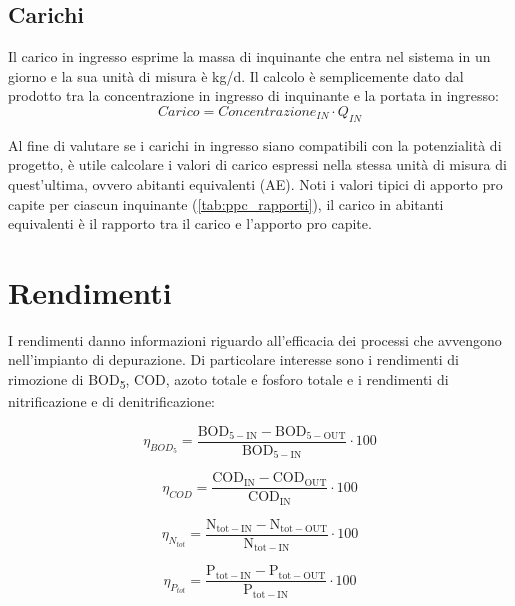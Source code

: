 \subsection{Carichi}
\label{subsec:carichi}
Il carico in ingresso esprime la massa di inquinante che entra nel sistema in un giorno e la sua unità di misura è kg/d. Il calcolo è semplicemente dato dal prodotto tra la concentrazione in ingresso di inquinante e la portata in ingresso:
\begin{equation}
Carico=Concentrazione_{IN}\cdot Q_{IN}
\end{equation}

Al fine di valutare se i carichi in ingresso siano compatibili con la potenzialità di progetto, è utile calcolare i valori di carico espressi nella stessa unità di misura di quest'ultima, ovvero abitanti equivalenti (AE). Noti i valori tipici di apporto pro capite per ciascun inquinante (\autoref{tab:ppc_rapporti}), il carico in abitanti equivalenti è il rapporto tra il carico e l'apporto pro capite.

\section{Rendimenti}
\label{sec:rend}
I rendimenti danno informazioni riguardo all'efficacia dei processi che avvengono nell'impianto di depurazione. Di particolare interesse sono i rendimenti di rimozione di BOD\textsubscript{5}, COD, azoto totale e fosforo totale e i rendimenti di nitrificazione e di denitrificazione:

\begin{equation}
\eta_{BOD_{5}}=\frac{\operatorname{BOD_{5-IN}}-\operatorname{BOD_{5-OUT}}}{\operatorname{BOD_{5-IN}}}\cdot 100
\end{equation}

\begin{equation}
\eta_{COD}=\frac{\operatorname{COD_{IN}}-\operatorname{COD_{OUT}}}{\operatorname{COD_{IN}}}\cdot 100
\end{equation}

\begin{equation}
\eta_{N_{tot}}=\frac{\operatorname{N_{tot-IN}}-\operatorname{N_{tot-OUT}}}{\operatorname{N_{tot-IN}}}\cdot 100
\end{equation}

\begin{equation}
\eta_{P_{tot}}=\frac{\operatorname{P_{tot-IN}}-\operatorname{P_{tot-OUT}}}{\operatorname{P_{tot-IN}}}\cdot 100
\end{equation}

